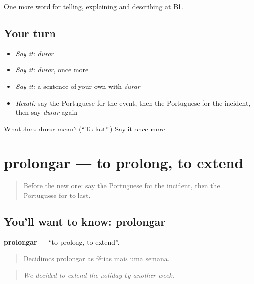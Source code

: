 \begin{grammarlens}[title={What you've built}]
One more word for telling, explaining and describing at B1.
\end{grammarlens}

\subsection*{Your turn}
\begin{itemize}
\raggedright
  \item \emph{Say it:} \emph{durar}
  \item \emph{Say it:} \emph{durar}, once more
  \item \emph{Say it:} a sentence of your own with \emph{durar}
  \item \emph{Recall:} say the Portuguese for the event, then the Portuguese for the incident, then say \emph{durar} again
\end{itemize}

\begin{tcolorbox}[breakable,colback=teal!4,colframe=teal!35!black,title={Before you move on}]
What does durar mean? (\textquotedblleft{}To last\textquotedblright{}.) Say it once more.
\end{tcolorbox}
\section[prolongar]{prolongar — to prolong, to extend}

\label{lesson:PT-C272-prolongar}



\begin{quote}
Before the new one: say the Portuguese for the incident, then the Portuguese for to last.
\end{quote}

\subsection*{You'll want to know: prolongar}
\textbf{prolongar} — \textquotedblleft{}to prolong, to extend\textquotedblright{}.

\begin{quote}
Decidimos prolongar as férias mais uma semana.
\end{quote}

\begin{quote}
\emph{We decided to extend the holiday by another week.}
\end{quote}

